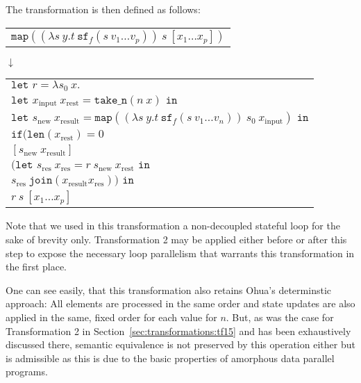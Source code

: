 The transformation is then defined as follows:
\begin{center}
    \begin{tabular}{l}
        $\texttt{map} ((\lambda s\ y.t\ \texttt{sf}_f(s\ v_1 \dots v_p))\ s\ [x_1 \dots x_p])$\\
    \end{tabular}

    $\downarrow$

    \begin{tabular}{l}
        $\texttt{let } r = \lambda s_0\ x.$\\
        \hspace*{.3cm}$\texttt{let } x_\text{input}\ x_\text{rest} = \texttt{take\_n}( n\ x) \texttt{ in}$\\
        \hspace*{.6cm}$\texttt{let } s_\text{new}\ x_\text{result} = \texttt{map} ((\lambda s\ y.t\ \texttt{sf}_f(s\ v_1 \dots v_n))\ s_0 \ x_\text{input}) \texttt{ in}$\\
        \hspace*{.9cm}$\texttt{if} (\texttt{len} (x_\text{rest}) = 0$\\
        \hspace*{1.5cm}$[s_\text{new}\ x_\text{result}]$\\
        \hspace*{1.5cm}$(\texttt{let } s_\text{res}\ x_\text{res} = r\ s_\text{new} \ x_\text{rest} \texttt{ in}$\\
        \hspace*{1.8cm}$s_\text{res}\ \texttt{join} (x_\text{result} x_\text{res})) \texttt{ in}$\\
        \hspace*{.3cm}$r \ s \ [x_1 \dots x_p]$
    \end{tabular}
\end{center}

Note that we used in this transformation a non-decoupled stateful loop for the sake of brevity only.
Transformation 2 may be applied either before or after this step to expose the necessary loop parallelism that warrants this transformation in the first place.

One can see easily, that this transformation also retains Ohua's determinstic approach: All elements are processed in the same order and state updates are also applied in the same, fixed order for each value for $n$.
But, as was the case for Transformation 2 in Section~\ref{sec:transformations:tf15} and has been exhaustively discussed there, semantic equivalence is not preserved by this operation either but is admissible as this is due to the basic properties of amorphous data parallel programs.


